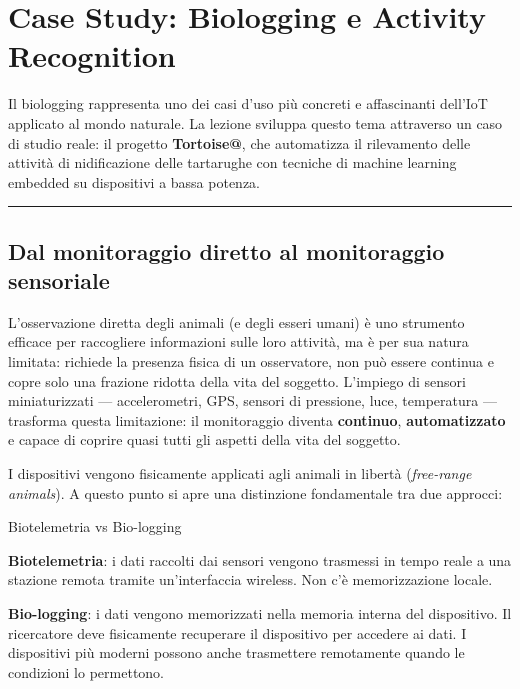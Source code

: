 \documentclass[
  italian,
  openany]{book}
\begin{document}
\newpage

\chapter{Case Study: Biologging e Activity
Recognition}\label{case-study-biologging-e-activity-recognition}

Il biologging rappresenta uno dei casi d'uso più concreti e affascinanti
dell'IoT applicato al mondo naturale. La lezione sviluppa questo tema
attraverso un caso di studio reale: il progetto \textbf{Tortoise@}, che
automatizza il rilevamento delle attività di nidificazione delle
tartarughe con tecniche di machine learning embedded su dispositivi a
bassa potenza.

\begin{center}\rule{0.5\linewidth}{0.5pt}\end{center}

\section{Dal monitoraggio diretto al monitoraggio
sensoriale}\label{dal-monitoraggio-diretto-al-monitoraggio-sensoriale}

L'osservazione diretta degli animali (e degli esseri umani) è uno
strumento efficace per raccogliere informazioni sulle loro attività, ma
è per sua natura limitata: richiede la presenza fisica di un
osservatore, non può essere continua e copre solo una frazione ridotta
della vita del soggetto. L'impiego di sensori miniaturizzati ---
accelerometri, GPS, sensori di pressione, luce, temperatura ---
trasforma questa limitazione: il monitoraggio diventa \textbf{continuo},
\textbf{automatizzato} e capace di coprire quasi tutti gli aspetti della
vita del soggetto.

I dispositivi vengono fisicamente applicati agli animali in libertà
(\emph{free-range animals}). A questo punto si apre una distinzione
fondamentale tra due approcci:

\begin{calloutdefinition}{Biotelemetria vs Bio-logging}

\textbf{Biotelemetria}: i dati raccolti dai sensori vengono trasmessi in
tempo reale a una stazione remota tramite un'interfaccia wireless. Non
c'è memorizzazione locale.

\textbf{Bio-logging}: i dati vengono memorizzati nella memoria interna
del dispositivo. Il ricercatore deve fisicamente recuperare il
dispositivo per accedere ai dati. I dispositivi più moderni possono
anche trasmettere remotamente quando le condizioni lo permettono.

\end{calloutdefinition}
\end{document}
